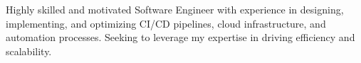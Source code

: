 

Highly skilled and motivated Software Engineer with experience in designing, implementing, and optimizing CI/CD pipelines, cloud infrastructure, and automation processes. Seeking to leverage my expertise in driving efficiency and scalability.